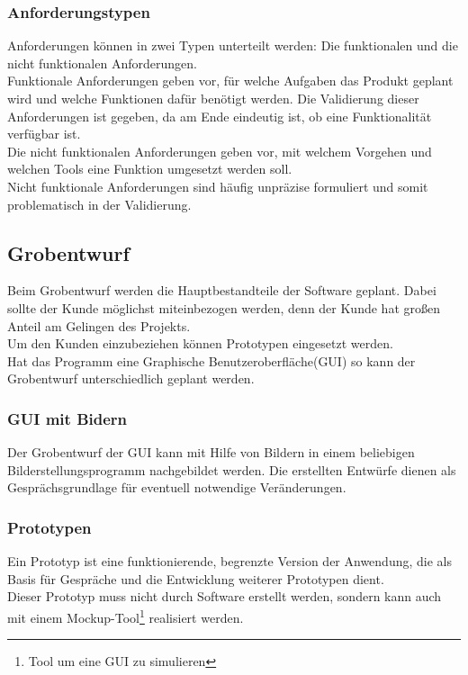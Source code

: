 \documentclass[12pt,a4paper]{article}
\begin{document}
\subsubsection{Anforderungstypen}
Anforderungen können in zwei Typen unterteilt werden: Die funktionalen und die nicht funktionalen Anforderungen.
\\Funktionale Anforderungen geben vor, für welche Aufgaben das Produkt geplant wird und welche Funktionen dafür benötigt werden. Die Validierung dieser Anforderungen ist gegeben, da am Ende eindeutig ist, ob eine Funktionalität verfügbar ist. \\
Die nicht funktionalen Anforderungen geben vor, mit welchem Vorgehen und welchen Tools eine Funktion umgesetzt werden soll\cite{10.1145/2884781.2884788}. \\
Nicht funktionale Anforderungen sind häufig unpräzise formuliert und somit problematisch in der Validierung\cite{10.1145/2884781.2884788}.
\subsection{Grobentwurf}
Beim Grobentwurf werden die Hauptbestandteile der Software geplant. Dabei sollte der Kunde möglichst miteinbezogen werden, denn der Kunde hat großen Anteil am Gelingen des Projekts\cite{10.1145/1060710.1060712}. \\
Um den Kunden einzubeziehen können Prototypen eingesetzt werden.\\
Hat das Programm eine Graphische Benutzeroberfläche(GUI) so kann der Grobentwurf unterschiedlich geplant werden. \\
\subsubsection{GUI mit Bidern}
Der Grobentwurf der GUI kann mit Hilfe von Bildern in einem beliebigen Bilderstellungsprogramm nachgebildet werden. Die erstellten Entwürfe dienen als Gesprächsgrundlage für eventuell notwendige Veränderungen. 
\subsubsection{Prototypen}
Ein Prototyp ist eine funktionierende, begrenzte Version der Anwendung, die als Basis für Gespräche und die Entwicklung weiterer Prototypen dient\cite{budde1992prototyping}. \\
Dieser Prototyp muss nicht durch Software erstellt werden, sondern kann auch mit einem Mockup-Tool\footnote{Tool um eine GUI zu simulieren} realisiert werden. \\
\end{document}
